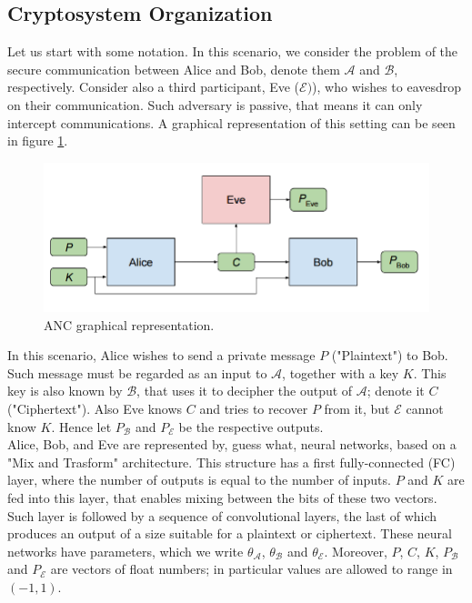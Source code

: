 \documentclass[%
    corpo=11pt,
    twoside,
    stile=classica,
    oldstyle,
    autoretitolo,
    tipotesi=magistrale,
    greek,
    evenboxes,
    english
]{toptesi}
\begin{document}
\subsection{Cryptosystem Organization}
Let us start with some notation. In this scenario, we consider the problem of the secure communication between Alice and Bob, denote them $\mathcal{A}$ and 
$\mathcal{B}$, respectively. Consider also a third participant, Eve ($\mathcal{E})$), who wishes to eavesdrop on their communication. Such adversary is passive, that means it can only intercept communications. A graphical representation of this setting can be seen in figure \ref{fig:anc}. \\
\begin{figure}[h]
\centering
\includegraphics[width=\textwidth]{pictures/anc.png}
\caption{ANC graphical representation.}
\label{fig:anc}
\end{figure}
In this scenario, Alice wishes to send a private message $P$  ("Plaintext") to Bob. Such message must be regarded as an input to $\mathcal{A}$, together with a key $K$. This key is also known by $\mathcal{B}$, that uses it to decipher the output of $\mathcal{A}$; denote it $C$ ("Ciphertext"). Also Eve knows $C$ and tries to recover $P$ from it, but $\mathcal{E}$ cannot know $K$. Hence let $P_{\mathcal{B}}$ and $P_{\mathcal{E}}$ be the respective outputs. \\
Alice, Bob, and Eve are represented by, guess what, neural networks, based on a "Mix and Trasform" architecture. This structure has a first fully-connected
(FC) layer, where the number of outputs is equal to the number of inputs. $P$ and $K$ are fed into this layer, that enables mixing between the bits of these two vectors. Such layer is followed by a sequence of convolutional layers, the last of which produces an output of a size suitable for a plaintext or ciphertext.  These neural networks have parameters, which we write $\theta_{\mathcal{A}}$, $\theta_{\mathcal{B}}$ and $\theta_{\mathcal{E}}$. Moreover, $P$, $C$, $K$, $P_{\mathcal{B}}$ and $P_{\mathcal{E}}$ are vectors of float numbers; in particular values are allowed to range in $(-1, 1)$. \\
\end{document}
